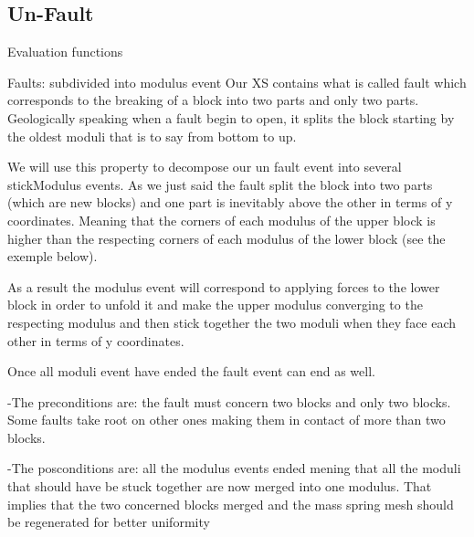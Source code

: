 \documentclass[12pt, a4paper]{memoir} %
\begin{document}
\subsection{Un-Fault}


Evaluation functions

Faults: subdivided into modulus event
	Our XS contains what is called fault which corresponds to the breaking of a block into two parts and only two parts. Geologically speaking when a fault begin to open, it splits the block starting by the oldest moduli that is to say from bottom to up. 
	
	We will use this property to decompose our un fault event into several stickModulus events. As we just said the fault split the block into two parts (which are new blocks) and one part is inevitably above the other in terms of y coordinates. Meaning that the corners of each modulus of the upper block is higher than the respecting corners of each modulus of the lower block (see the exemple below). 
	
	As a result the modulus event will correspond to applying forces to the lower block in order to unfold it and make the upper modulus converging to the respecting modulus and then stick together the two moduli when they face each other in terms of y coordinates.
	
	Once all moduli event have ended the fault event can end as well.
	
	-The preconditions are: the fault must concern two blocks and only two blocks. Some faults take root on other ones making them in contact of more than two blocks. 
	
	-The posconditions are: all the modulus events ended mening that all the moduli that should have be stuck together are now merged into one modulus. That implies that the two concerned blocks merged and the mass spring mesh should be regenerated for better uniformity 
	
\end{document}

